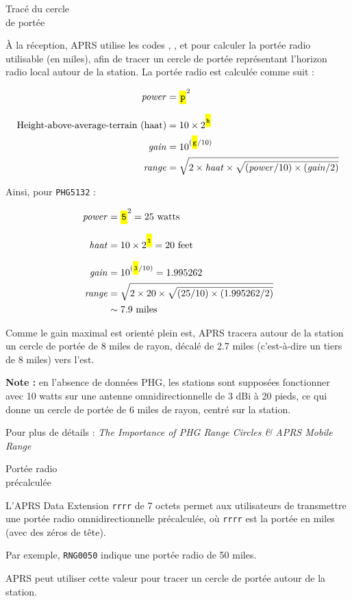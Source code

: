 \begin{aprssideblock}{Tracé du cercle\\de portée}
\label{range-circle-plot}
À la réception, APRS utilise les codes , ,
 et  pour calculer la portée radio utilisable (en
miles), afin de tracer un cercle de portée représentant l'horizon radio
local autour de la station. La portée radio est calculée comme suit :

{\small
\[
\begin{aligned}
\mathit{power} &= \text{\lit{p}}^{2} \\[0.6em]
\text{Height-above-average-terrain (haat)} &= 10 \times 2^{\text{\lit{h}}} \\
\mathit{gain} &= 10^{(\text{\lit{g}}/10)} \\
\mathit{range} &= \sqrt{2 \times \mathit{haat} \times
  \sqrt{(\mathit{power}/10) \times (\mathit{gain}/2)}}
\end{aligned}
\]
}

Ainsi, pour \texttt{PHG5132} :

\[
\begin{aligned}
\mathit{power} &= \text{\lit{5}}^{2} = 25\ \text{watts} \\[0.6em]
\mathit{haat} &= 10 \times 2^{\text{\lit{1}}} = 20\ \text{feet} \\[0.6em]
\mathit{gain} &= 10^{(\text{\lit{3}}/10)} = 1.995262 \\
\mathit{range} &= \sqrt{2 \times 20 \times
  \sqrt{(25/10) \times (1.995262/2)}} \\
&\mathrel{\sim} 7.9\ \text{miles}
\end{aligned}
\]

Comme le gain maximal est orienté plein est, APRS tracera autour
de la station un cercle de portée de 8 miles de rayon, décalé de
2.7 miles (c'est-à-dire un tiers de 8 miles) vers l'est.

\textbf{Note :} en l'absence de données PHG, les stations sont supposées
fonctionner avec 10 watts sur une antenne omnidirectionnelle de 3 dBi à
20 pieds, ce qui donne un cercle de portée de 6 miles de rayon, centré
sur la station.

Pour plus de détails :
\textit{The Importance of PHG Range Circles \& APRS Mobile Range}
\end{aprssideblock}

\begin{aprssideblock}{Portée radio\\précalculée}
\label{pre-calculated-radio-range}
L'APRS Data Extension \texttt{rrrr} de 7 octets permet aux
utilisateurs de transmettre une portée radio omnidirectionnelle
précalculée, où \texttt{rrrr} est la portée en miles (avec des zéros de
tête).

Par exemple, \texttt{RNG0050} indique une portée radio de 50 miles.

APRS peut utiliser cette valeur pour tracer un cercle de portée autour
de la station.
\end{aprssideblock}

